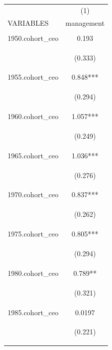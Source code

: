 \begin{center}
\begin{tabular}{lc} \hline
 & (1) \\
VARIABLES & management \\ \hline
\vspace{4pt} & \begin{footnotesize}\end{footnotesize} \\
1950.cohort\_ceo & 0.193 \\
\vspace{4pt} & \begin{footnotesize}(0.333)\end{footnotesize} \\
1955.cohort\_ceo & 0.848*** \\
\vspace{4pt} & \begin{footnotesize}(0.294)\end{footnotesize} \\
1960.cohort\_ceo & 1.057*** \\
\vspace{4pt} & \begin{footnotesize}(0.249)\end{footnotesize} \\
1965.cohort\_ceo & 1.036*** \\
\vspace{4pt} & \begin{footnotesize}(0.276)\end{footnotesize} \\
1970.cohort\_ceo & 0.837*** \\
\vspace{4pt} & \begin{footnotesize}(0.262)\end{footnotesize} \\
1975.cohort\_ceo & 0.805*** \\
\vspace{4pt} & \begin{footnotesize}(0.294)\end{footnotesize} \\
1980.cohort\_ceo & 0.789** \\
\vspace{4pt} & \begin{footnotesize}(0.321)\end{footnotesize} \\
1985.cohort\_ceo & 0.0197 \\
\vspace{4pt} & \begin{footnotesize}(0.221)\end{footnotesize} \\

\end{tabular}
\end{center}
